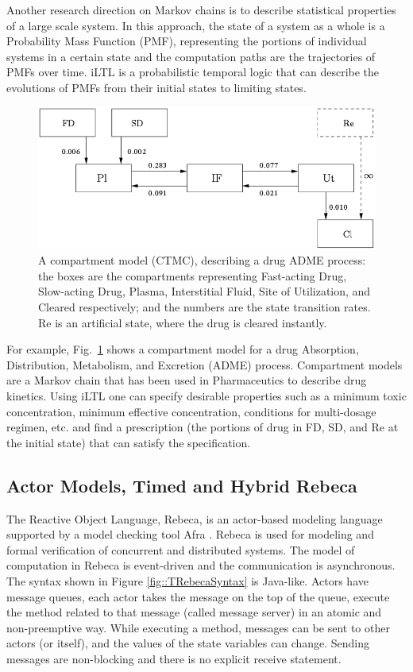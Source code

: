 \documentclass[
graybox,
envcountchap
]{svmult}
\begin{document}
\begin{bibunit}
Another research direction on Markov chains is to describe statistical properties of a large scale system. In this approach, the state of a system as a whole is a Probability Mass Function (PMF), representing the portions of individual systems in a certain state and the computation paths are the trajectories of PMFs over time. iLTL is a probabilistic temporal logic that can describe the evolutions of PMFs from their initial states to limiting states. 

\begin{figure}
\centering
\includegraphics[width=.6\columnwidth]{assets/compartment_model.png}
\caption{
    A compartment model (CTMC), describing a drug ADME process: the boxes are the compartments representing Fast-acting Drug, Slow-acting Drug, Plasma, Interstitial Fluid, Site of Utilization, and Cleared respectively; and the numbers are the state transition rates. Re is an artificial state, where the drug is cleared instantly.}
\label{fig:comparment}
\end{figure}

For example, Fig.~\ref{fig:comparment} shows a compartment model for a drug Absorption, Distribution, Metabolism, and Excretion (ADME) process. Compartment models are a Markov chain that has been used in Pharmaceutics to describe drug kinetics. Using iLTL one can specify desirable properties such as a minimum toxic concentration, minimum effective concentration, conditions for multi-dosage regimen, etc. and find a prescription (the portions of drug in FD, SD, and Re at the initial state) that can satisfy the specification.


\subsection{Actor Models,  Timed and Hybrid Rebeca}
The Reactive Object Language, Rebeca, is an actor-based modeling language  supported by a model checking tool Afra \cite{DBLP:journals/fuin/SirjaniMSB04,DBLP:conf/birthday/SirjaniJ11}.
Rebeca is used for modeling and formal verification of concurrent and distributed systems.
The model of computation in  Rebeca is event-driven and the communication is asynchronous.
The syntax shown in Figure \ref{fig::TRebecaSyntax} is Java-like. 
Actors have message queues, each actor takes the message on the top of the queue, execute the method related to that message (called message server) in an atomic and non-preemptive way. While executing a method, messages can be sent to other actors (or itself), and the values of the state variables can change. Sending messages are non-blocking and there is no explicit receive statement.


\end{bibunit}
\end{document}
